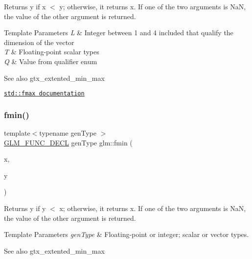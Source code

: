 Returns y if x $<$ y; otherwise, it returns x. If one of the two arguments is NaN, the value of the other argument is returned.


\begin{DoxyTemplParams}{Template Parameters}
{\em L} & Integer between 1 and 4 included that qualify the dimension of the vector \\
\hline
{\em T} & Floating-\/point scalar types \\
\hline
{\em Q} & Value from qualifier enum\\
\hline
\end{DoxyTemplParams}
\begin{DoxySeeAlso}{See also}
gtx\+\_\+extented\+\_\+min\+\_\+max 

\href{http://en.cppreference.com/w/cpp/numeric/math/fmax}{\tt std\+::fmax documentation} 
\end{DoxySeeAlso}
\mbox{\label{group__gtx__extended__min__max_gaa3200559611ac5b9b9ae7283547916a7}} 
\subsubsection{\texorpdfstring{fmin()}{fmin()}\hspace{0.1cm}{\footnotesize\ttfamily [1/3]}}
{\footnotesize\ttfamily template$<$typename gen\+Type $>$ \\
\hyperlink{setup_8hpp_ab2d052de21a70539923e9bcbf6e83a51}{G\+L\+M\+\_\+\+F\+U\+N\+C\+\_\+\+D\+E\+CL} gen\+Type glm\+::fmin (\begin{DoxyParamCaption}\item[{gen\+Type}]{x,  }\item[{gen\+Type}]{y }\end{DoxyParamCaption})}

Returns y if y $<$ x; otherwise, it returns x. If one of the two arguments is NaN, the value of the other argument is returned.


\begin{DoxyTemplParams}{Template Parameters}
{\em gen\+Type} & Floating-\/point or integer; scalar or vector types.\\
\hline
\end{DoxyTemplParams}
\begin{DoxySeeAlso}{See also}
gtx\+\_\+extented\+\_\+min\+\_\+max 
\end{DoxySeeAlso}
\mbox{\label{group__gtx__extended__min__max_gae989203363cff9eab5093630df4fe071}} 
